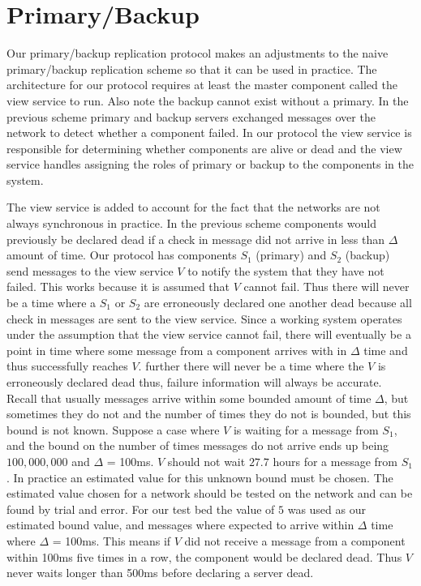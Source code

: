 \documentclass[conference]{IEEEtran}
\begin{document}
\section{Primary/Backup}
Our primary/backup replication protocol makes an adjustments to the naive primary/backup replication scheme so that it can be used in practice. The architecture for our protocol requires at least the master component called the view service to run.  Also note the backup cannot exist without a primary. In the previous scheme primary and backup servers exchanged messages over the network to detect whether a component failed. In our protocol the view service is responsible for determining whether components are alive or dead and the view service handles assigning the roles of primary or backup to the components in the system.

The view service is added to account for the fact that the networks are not always synchronous in practice. In the previous scheme components would previously be declared dead if a check in message did not arrive in less than $\Delta$ amount of time. Our protocol has components \(S_1\) (primary) and \(S_2\) (backup) send messages to the view service \(V\) to notify the system that they have not failed. This works because it is assumed that \(V\) cannot fail. Thus there will never be a time where a \(S_1\) or \(S_2\) are erroneously declared one another dead because all check in messages are sent to the view service. Since a working system operates under the assumption that the view service cannot fail, there will eventually be a point in time where some message from a component arrives with in $\Delta$ time and thus successfully reaches \(V\). further there will never be a time where the \(V\) is erroneously declared dead thus, failure information will always be accurate. Recall that usually messages arrive within some bounded amount of time $\Delta$, but sometimes they do not and the number of times they do not is bounded, but this bound is not known. Suppose a case where \(V\) is waiting for a message from \(S_1\), and the bound on the number of times messages do not arrive ends up being \(100,000,000\) and $\Delta$ = 100ms. \(V\) should not wait \(27.7\) hours for a message from \(S_1\). In practice an estimated value for this unknown bound must be chosen. The estimated value chosen for a network should be tested on the network and can be found by trial and error. For our test bed the value of \(5\) was used as our estimated bound value, and messages where expected to arrive within $\Delta$ time where $\Delta$ = 100ms. This means if \(V\) did not receive a message from a component within 100ms five times in a row, the component would be declared dead. Thus \(V\) never waits longer than 500ms before declaring a server dead. 
\end{document}
